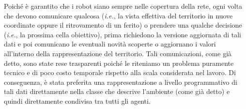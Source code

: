 Poiché è garantito che i robot siano sempre nelle copertura della rete, ogni volta che devono comunicare qualcosa (\textit{i.e.}, la vista effettiva del territorio in nuove coordinate oppure il ritrovamento di un ferito) o prendere una qualche decisione (\textit{i.e.}, la prossima cella obiettivo), prima richiedono la versione aggiornata di tali dati e poi comunicano le eventuali novità scoperte o aggiornano i valori all'interno della rappresentazione del territorio.
Tali comunicazioni, come già detto, sono state rese trasparenti poiché le riteniamo un problema puramente tecnico e di poco costo temporale rispetto alla scala considerata nel lavoro. Di conseguenza, è stata preferita una rappresentazione a livello programmativo di tali dati direttamente nella classe che descrive l'ambiente (come già detto) e quindi direttamente condivisa tra tutti gli agenti.

